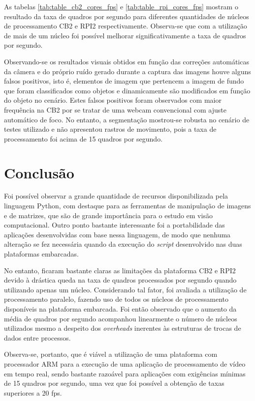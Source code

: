 \documentclass[conference]{IEEEtran}
\begin{document}
As tabelas \ref{tab:table_cb2_cores_fps} e \ref{tab:table_rpi_cores_fps} mostram o resultado da taxa de quadros por segundo para diferentes quantidades de núcleos de processamento CB2 e RPI2 respectivamente. Observa-se que com a utilização de mais de um núcleo foi possível melhorar significativamente a taxa de quadros por segundo.

Observando-se os resultados visuais obtidos em função das correções automáticas da câmera e do próprio ruído gerado durante a captura das imagens houve alguns falsos positivos, isto é, elementos de imagem que pertencem a imagem de fundo que foram classificados como objetos e dinamicamente são modificados em função do objeto no cenário. Estes falsos positivos foram observados com maior frequência na CB2 por se tratar de uma webcam convencional com ajuste automático de foco. No entanto, a segmentação mostrou-se robusta no cenário de testes utilizado e não apresentou rastros de movimento, pois a taxa de processamento foi acima de 15 quadros por segundo.



\section{Conclusão}
Foi possível observar a grande quantidade de recursos disponibilizada pela linguagem Python, com destaque para as ferramentas de manipulação de imagens e de matrizes, que são de grande importância para o estudo em visão computacional. Outro ponto bastante interessante foi a portabilidade das aplicações desenvolvidas com base nessa linguagem, de modo que nenhuma alteração se fez necessária quando da execução do \textit{script} desenvolvido nas duas plataformas embarcadas.

No entanto, ficaram bastante claras as limitações da plataforma CB2 e RPI2 devido à drástica queda na taxa de quadros processados por segundo quando utilizando apenas um núcleo. Considerando tal fator, foi avaliada a utilização de processamento paralelo, fazendo uso de todos os núcleos de processamento disponíveis na plataforma embarcada. Foi então observado que o aumento da média de quadros por segundo acompanhou linearmente o número de núcleos utilizados mesmo a despeito dos \textit{overheads} inerentes às estruturas de trocas de dados entre processos.

Observa-se, portanto, que é viável a utilização de uma plataforma com processador ARM para a execução de uma aplicação de processamento de vídeo em tempo real, sendo bastante razoável para aplicações com exigências mínimas de 15 quadros por segundo, uma vez que foi possível a obtenção de taxas superiores a 20 fps. 
\end{document}
